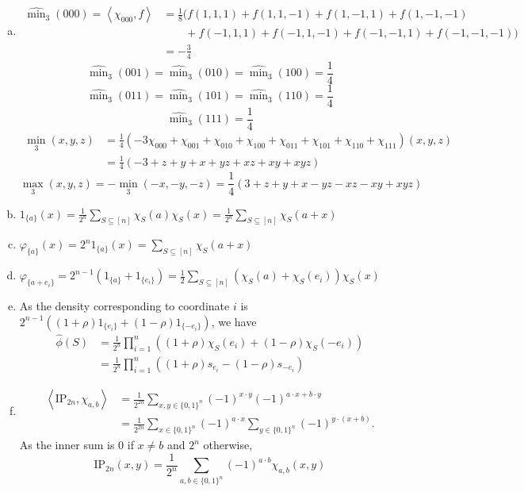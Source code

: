 \documentclass[12pt]{article}
\newcommand{\bitset}{\{0,1\}}
\newcommand{\set}[1]{\{#1\}}
\newcommand{\eqn}[1]{\begin{equation*}#1\end{equation*}}
\newcommand{\sumx}{\sum_{x \in \bitset^n}}
\newcommand{\sumS}{\sum_{S \subseteq [n]}}
\renewcommand{\ip}[1]{\left\langle#1\right\rangle}
\begin{document}
\begin{enumerate}[(a)]
    \item \begin{align*}
		     \widehat{\min}_3(000) = \ip{\chi_{000}, f} &= \frac{1}{8}(f(1,1,1) + f(1,1,-1) + f(1,-1,1) + f(1,-1,-1)\\
		     &\qquad + f(-1,1,1) + f(-1,1,-1) + f(-1,-1,1) + f(-1,-1,-1))\\
		     &= -\frac{3}{4}
	      \end{align*}
	      \eqn{\widehat{\min}_3(001) = \widehat{\min}_3(010) = \widehat{\min}_3(100) = \frac{1}{4}}
	      \eqn{\widehat{\min}_3(011) = \widehat{\min}_3(101) = \widehat{\min}_3(110) = \frac{1}{4}}
	      \eqn{\widehat{\min}_3(111) = \frac{1}{4}}
	      \begin{align*}
	      	{\min}_3(x,y,z) &= \frac{1}{4}(-3\chi_{000} + \chi_{001} + \chi_{010} + \chi_{100} + \chi_{011} + \chi_{101} + \chi_{110} + \chi_{111})(x,y,z)\\
	      	&= \frac{1}{4}(-3 + z + y + x + yz + xz + xy + xyz)
	      \end{align*}
	      \eqn{{\max}_3(x,y,z) = - {\min}_3(-x,-y,-z) = \frac{1}{4}(3 + z + y + x - yz - xz - xy + xyz)}

    \item $1_{\set{a}}(x) = \frac{1}{2^n}\sumS \chi_S(a) \chi_S(x) = \frac{1}{2^n}\sumS \chi_S(a+x)$

    \item $\varphi_{\set{a}}(x) = 2^n 1_{\set{a}}(x) = \sumS \chi_S(a+x)$

    \item $\varphi_{\set{a + e_i}} = 2^{n-1} (1_{\set{a}} + 1_{\set{e_i}}) = \frac{1}{2}\sumS (\chi_S(a) + \chi_S(e_i)) \chi_S(x)$

    \item As the density corresponding to coordinate $i$ is $2^{n-1}\left((1 + \rho) 1_{\set{e_i}} + (1 - \rho)1_{\set{-e_i}}\right)$, we have
	      \begin{align*}
	      	\widehat{\phi}(S) &= \frac{1}{2^n}\prod_{i=1}^n((1+\rho)\chi_S(e_i) + (1-\rho)\chi_S(-e_i))\\
	      	&= \frac{1}{2^n}\prod_{i=1}^n((1+\rho)s_{e_i} - (1-\rho) s_{-e_i})
	      \end{align*}

	      \item \begin{align*}
	      		  \ip{\text{IP}_{2n}, \chi_{a,b}} &= \frac{1}{2^{2n}}\sum_{x, y \in \bitset^n} (-1)^{x \cdot y} (-1)^{a \cdot x + b \cdot y}\\
	      		  &= \frac{1}{2^{2n}}\sumx (-1)^{a \cdot x} \sum_{y \in \bitset^n} (-1)^{y \cdot (x + b)}.
	      		\end{align*}
	     As the inner sum is 0 if $x \neq b$ and $2^n$ otherwise,
	     \eqn{\text{IP}_{2n}(x,y) = \frac{1}{2^n}\sum_{a, b \in \bitset^n} (-1)^{a \cdot b} \chi_{a,b}(x,y)}


\end{enumerate}
\end{document}
